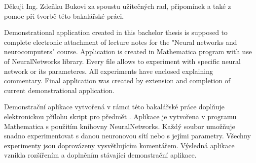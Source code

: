\documentclass[11pt,twoside,a4paper]{book}
\begin{document}

\coverpagestarts


\acknowledgements
\noindent
Děkuji Ing. Zdeňku Bukovi za spoustu užitečných rad, připomínek a také z pomoc při tvorbě této bakalářské práci.





 
\abstractpage

Demonstrational application created in this bachelor thesis is supposed to complete electronic attachment of lecture notes for the "Neural networks and neurocomputers" course. Application is created in Mathematica program with use of NeuralNetworks library. Every file allows to experiment with specific neural network or its parameteres. All experiments have enclosed explaining commentary. Final application was created by extension and completion of current demonstrational application.

\baselineskip

\noindent
Demonstrační aplikace vytvořená v rámci této bakalářské práce doplňuje elektronickou přílohu skript pro předmět . Aplikace je vytvořena v programu Mathematica s použitím knihovny NeuralNetworks. Každý soubor umožňuje snadno experimentovat s danou neuronovou sítí nebo s jejími parametry. Všechny experimenty jsou doprovázeny vysvětlujícím komentářem. Výsledná aplikace vznikla rozšířením a doplněním stávající demonstrační aplikace.


\tableofcontents



\listoffigures



\listoftables


\end{document}
